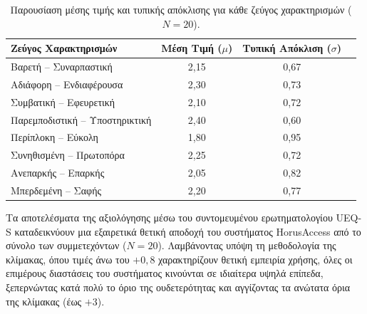 \documentclass[twoside, a4paper, 11pt]{article}
\newcommand{\textlatin}[1]{\textenglish{#1}}
\begin{document}
\begin{table}[H]
    \centering
    \caption{Παρουσίαση μέσης τιμής και τυπικής απόκλισης για κάθε ζεύγος χαρακτηρισμών ($N = 20$).}
    \label{tab:ueq_summary}
    \begin{tabular}{|l|c|c|c|}
        \hline
        \textbf{Ζεύγος Χαρακτηρισμών} & \textbf{Μέση Τιμή ($\mu$)} & \textbf{Τυπική Απόκλιση ($\sigma$)} \\ \hline
        Βαρετή – Συναρπαστική & 2,15 & 0,67 \\ \hline
        Αδιάφορη – Ενδιαφέρουσα & 2,30 & 0,73  \\ \hline
        Συμβατική – Εφευρετική & 2,10 & 0,72 \\ \hline
        Παρεμποδιστική – Υποστηρικτική & 2,40 & 0,60 \\ \hline
        Περίπλοκη – Εύκολη & 1,80 & 0,95 \\ \hline
        Συνηθισμένη – Πρωτοπόρα & 2,25 & 0,72  \\ \hline
        Ανεπαρκής – Επαρκής & 2,05 & 0,82  \\ \hline
        Μπερδεμένη – Σαφής & 2,20 & 0,77  \\ \hline
    \end{tabular}
\end{table}


Τα αποτελέσματα της αξιολόγησης μέσω του συντομευμένου ερωτηματολογίου \textlatin{UEQ-S} καταδεικνύουν μια εξαιρετικά θετική αποδοχή του συστήματος \textlatin{HorusAccess} από το σύνολο των συμμετεχόντων ($N = 20$). Λαμβάνοντας υπόψη τη μεθοδολογία της κλίμακας, όπου τιμές άνω του $+0,8$ χαρακτηρίζουν θετική εμπειρία χρήσης, όλες οι επιμέρους διαστάσεις του συστήματος κινούνται σε ιδιαίτερα υψηλά επίπεδα, ξεπερνώντας κατά πολύ το όριο της ουδετερότητας και αγγίζοντας τα ανώτατα όρια της κλίμακας (έως $+3$).
\end{document}
